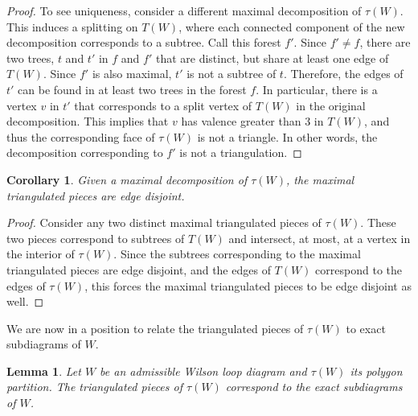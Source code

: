 \documentclass[11pt]{article}
\newtheorem{lem}[thm]{Lemma}
\newtheorem{cor}[thm]{Corollary}
\theoremstyle{remark}
\theoremstyle{definition}
\begin{document}
\begin{proof}
To see uniqueness, consider a different maximal decomposition of $\tau(W)$. This induces a splitting on $T(W)$, where each connected component of the new decomposition corresponds to a subtree. Call this forest $f'$. Since $f' \neq f$, there are two trees, $t$ and $t'$ in $f$ and $f'$ that are distinct, but share at least one edge of $T(W)$. Since $f'$ is also maximal, $t'$ is not a subtree of $t$. Therefore, the edges of $t'$ can be found in at least two trees in the forest $f$. In particular, there is a vertex $v$ in $t'$ that corresponds to a split vertex of $T(W)$ in the original decomposition.
This implies that $v$ has valence greater than $3$ in $T(W)$, and thus the corresponding face of $\tau(W)$ is not a triangle. In other words, the decomposition corresponding to $f'$ is not a triangulation. 
\end{proof}

\begin{cor} \label{maxtriangdisjointcor}
Given a maximal decomposition of $\tau(W)$, the maximal triangulated pieces are edge disjoint.
\end{cor}

\begin{proof}
Consider any two distinct maximal triangulated pieces of $\tau(W)$. These two pieces correspond to subtrees of $T(W)$ and intersect, at most, at a vertex in the interior of $\tau(W)$. Since the subtrees corresponding to the maximal triangulated pieces are edge disjoint, and the edges of $T(W)$ correspond to the edges of $\tau(W)$, this forces the maximal triangulated pieces to be edge disjoint as well.
\end{proof}


We are now in a position to relate the triangulated pieces of $\tau(W)$ to exact subdiagrams of $W$.


\begin{lem}\label{lem triang to exact}
  Let $W$ be an admissible Wilson loop diagram and $\tau(W)$ its polygon partition.  The triangulated pieces of $\tau(W)$ correspond to the exact subdiagrams of $W$.
\end{lem}
\end{document}

